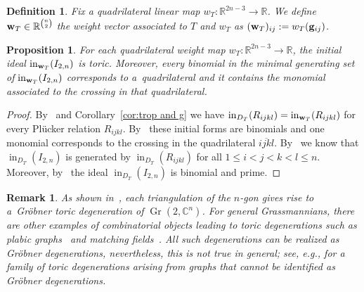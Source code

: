 \documentclass[pdftex]{sigma}%
\newtheorem{Proposition}[Theorem]{Proposition}
\newtheorem{Definition}[Theorem]{Definition}
\newtheorem{Remark}[Theorem]{Remark}}
\numberwithin{equation}{section}
\DeclareMathOperator{\init}{in}
\DeclareMathOperator{\Gr}{Gr}
\begin{document}
\begin{Definition}
Fix
a quadrilateral linear map $w_T\colon \mathbb R^{2n-3}\to \mathbb R$.
We define ${\bf w}_T\in\mathbb R^{\binom{n}{2}}$ the {\it weight vector associated to $T$ and $w_T$} as $({\bf w}_T)_{ij}:=w_T({\bf g}_{ij})$.
\end{Definition}

{\sloppy
\begin{Proposition}
For each quadrilateral weight map $w_T\colon \mathbb R^{2n-3}\to \mathbb R$, the initial ideal $\init_{{\bf w}_T}(I_{2,n})$ is toric.
Moreover, every binomial in the minimal generating set of $\init_{{\bf w}_T}(I_{2,n})$ corresponds to a~quadrilateral and it contains the monomial associated to the crossing in that quadrilateral.
\end{Proposition}

}

\begin{proof}
By~ and Corollary~\ref{cor:trop and g} we have $\init_{{D_T}}(R_{ijkl}) = \init_{{\bf w}_T}(R_{ijkl})$ for every Pl\"ucker relation $R_{ijkl}$.
By~ these initial forms are binomials and one monomial corresponds to the crossing in the quadrilateral $\overline{ijkl}$.
By~\cite[Proof of Theorem~3.4]{SS04} we know that $\init_{{D_T}}(I_{2,n})$ is generated by $\init_{{D_T}}(R_{ijkl})$ for all $1\le i<j<k<l\le n$.
Moreover, by~\cite[Corollary~4.4]{SS04} the ideal $\init_{{D_T}}(I_{2,n})$ is binomial and prime.
\end{proof}

\begin{Remark}
As shown in~, each triangulation of the $n$-gon gives rise to a~Gr\"obner toric degeneration of $\Gr(2,\mathbb C^n)$.
For general Grassmannians, there are other examples of combinatorial objects leading to toric degenerations such as
plabic graphs~\cite{BFFHL,RW17} and matching fields~\cite{clarke2021combinatorial,clarke2019toric, MoSh}.
All such degenerations can be realized as Gr\"obner degenerations, nevertheless, this is not true in general; see, e.g.,
\cite{kateri2015family} for a family of toric degenerations arising from graphs that cannot be identified as Gr\"obner degenerations.
\end{Remark}
\end{document}
